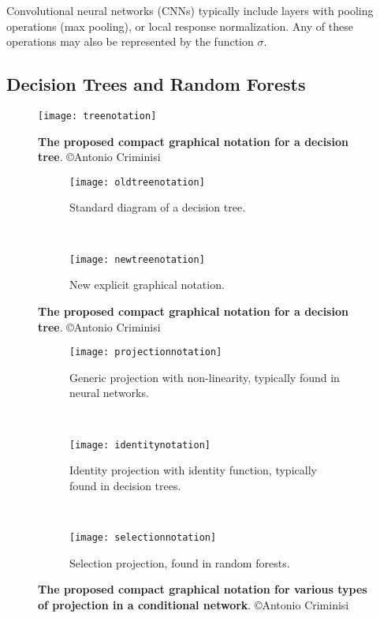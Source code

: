 \documentclass[thesis]{subfiles}
\begin{document}
Convolutional neural networks (CNNs) typically include layers with pooling operations (\eg max pooling), or local response normalization. Any of these operations may also be represented by the function $\sigma$.

\subsection{Decision Trees and Random Forests}

\begin{figure}[htbp!] 
\centering
\texttt{[image: treenotation]}
\caption[New graphical notation for a binary decision tree.]{{\bf The proposed compact graphical notation for a decision tree}. \copyright Antonio Criminisi}
\label{fig:treeNotation}
\end{figure}

\begin{figure}[htbp!] 
\centering
\begin{subfigure}[b]{0.4\textwidth}
   \centering
   \texttt{[image: oldtreenotation]}
   \caption{Standard diagram of a decision tree.}
   \label{fig:oldtreenotation}
\end{subfigure}
~
\begin{subfigure}[b]{0.4\textwidth}
   \centering
   \texttt{[image: newtreenotation]}
   \caption{New explicit graphical notation.}
   \label{fig:newtreenotation}
\end{subfigure}
\caption[New graphical notation for a binary decision tree.]{{\bf The proposed compact graphical notation for a decision tree}. \copyright Antonio Criminisi}
\label{fig:complexDecisionTree}
\end{figure}

\begin{figure}[htbp!] 
\centering
\begin{subfigure}[b]{\textwidth}
   \centering
   \texttt{[image: projectionnotation]}
   \caption{Generic projection with non-linearity, typically found in neural networks.}
   \label{fig:projectionnotation}
\end{subfigure}
~
\begin{subfigure}[b]{\textwidth}
   \centering
   \texttt{[image: identitynotation]}
   \caption{Identity projection with identity function, typically found in decision trees.}
   \label{fig:identitynotation}
\end{subfigure}
~
\begin{subfigure}[b]{\textwidth}
   \centering
   \texttt{[image: selectionnotation]}
   \caption{Selection projection, found in random forests.}
   \label{fig:selectionnotation}
\end{subfigure}
\caption[Various projection matrices in conditional networks.]{{\bf The proposed compact graphical notation for various types of projection in a conditional network}. \copyright Antonio Criminisi}
\label{fig:projections}
\end{figure}
\end{document}
